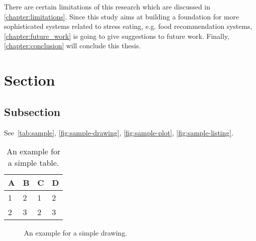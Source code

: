 There are certain limitations of this research which are discussed in \autoref{chapter:limitations}. Since this study aims at building a foundation for more sophisticated systems related to stress eating, e.g. food recommendation systems, \autoref{chapter:future_work} is going to give suggestions to future work. Finally, \autoref{chapter:conclusion} will conclude this thesis.

\section{Section}

\subsection{Subsection}

See~\autoref{tab:sample}, \autoref{fig:sample-drawing}, \autoref{fig:sample-plot}, \autoref{fig:sample-listing}.

\begin{table}[htpb]
  \caption[Example table]{An example for a simple table.}\label{tab:sample}
  \centering
  \begin{tabular}{l l l l}
    \toprule
      A & B & C & D \\
    \midrule
      1 & 2 & 1 & 2 \\
      2 & 3 & 2 & 3 \\
    \bottomrule
  \end{tabular}
\end{table}

\begin{figure}[htpb]
  \centering
  \caption[Example drawing]{An example for a simple drawing.}\label{fig:sample-drawing}
\end{figure}

